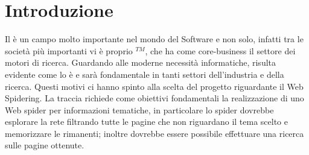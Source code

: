 \chapter{Introduzione}
Il  è un campo molto importante nel mondo del Software e non solo, infatti tra le società più importanti vi è proprio $^{TM}$, che ha come core-business il settore dei motori di ricerca. Guardando alle moderne necessità informatiche, risulta evidente come lo  è e sarà fondamentale in tanti settori dell'industria e della ricerca. Questi motivi ci hanno spinto alla scelta del progetto riguardante il Web Spidering. La traccia richiede come obiettivi fondamentali la realizzazione di uno Web spider per informazioni tematiche, in particolare lo spider dovrebbe esplorare la rete filtrando tutte le pagine che non riguardano il tema scelto e memorizzare le rimanenti; inoltre dovrebbe essere possibile effettuare una ricerca sulle pagine ottenute.